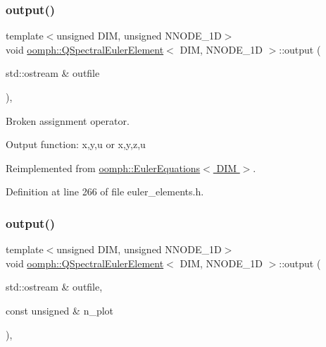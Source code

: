 \subsubsection{\texorpdfstring{output()}{output()}\hspace{0.1cm}{\footnotesize\ttfamily [1/2]}}
{\footnotesize\ttfamily template$<$unsigned D\+IM, unsigned N\+N\+O\+D\+E\+\_\+1D$>$ \\
void \hyperlink{classoomph_1_1QSpectralEulerElement}{oomph\+::\+Q\+Spectral\+Euler\+Element}$<$ D\+IM, N\+N\+O\+D\+E\+\_\+1D $>$\+::output (\begin{DoxyParamCaption}\item[{std\+::ostream \&}]{outfile }\end{DoxyParamCaption})\hspace{0.3cm}{\ttfamily [inline]}, {\ttfamily [virtual]}}



Broken assignment operator. 

Output function\+: x,y,u or x,y,z,u 

Reimplemented from \hyperlink{classoomph_1_1EulerEquations_a4478d473edbda3529602c75f70cafe30}{oomph\+::\+Euler\+Equations$<$ D\+I\+M $>$}.



Definition at line 266 of file euler\+\_\+elements.\+h.

\mbox{\label{classoomph_1_1QSpectralEulerElement_a026cdb8f38d01e15906db12ae1e4c4f1}} 
\subsubsection{\texorpdfstring{output()}{output()}\hspace{0.1cm}{\footnotesize\ttfamily [2/2]}}
{\footnotesize\ttfamily template$<$unsigned D\+IM, unsigned N\+N\+O\+D\+E\+\_\+1D$>$ \\
void \hyperlink{classoomph_1_1QSpectralEulerElement}{oomph\+::\+Q\+Spectral\+Euler\+Element}$<$ D\+IM, N\+N\+O\+D\+E\+\_\+1D $>$\+::output (\begin{DoxyParamCaption}\item[{std\+::ostream \&}]{outfile,  }\item[{const unsigned \&}]{n\+\_\+plot }\end{DoxyParamCaption})\hspace{0.3cm}{\ttfamily [inline]}, {\ttfamily [virtual]}}



